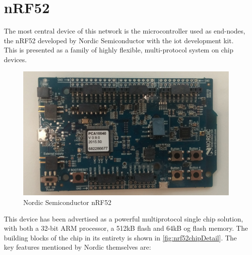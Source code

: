 \section{nRF52}

The most central device of this network is the microcontroller used as end-nodes, the nRF52 developed by Nordic Semiconductor with the \gls{iot} development kit. This is presented as a family of highly flexible, multi-protocol system on chip devices. 



\begin{figure}[ht]
    \centering
    \includegraphics[scale=0.32]{nrf52.png}    
    \caption{Nordic Semiconductor nRF52  }
    \label{fig:nrf52picture}
\end{figure}

\cite{nrf52Nordic}

This device has been advertised as a powerful multiprotocol single chip solution, with both a 32-bit ARM processor, a 512kB flash and 64kB og flash memory. The building blocks of the chip in its entirety is shown in \ref{fig:nrf52chipDetail}. The key features mentioned by Nordic themselves are: 

